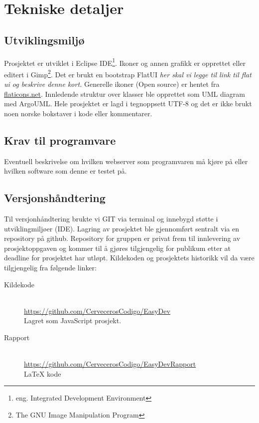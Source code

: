 \section{Tekniske detaljer}

\subsection{Utviklingsmiljø} \label{subssec:utvmiljo}
Prosjektet er utviklet i Eclipse IDE\footnote{eng. Integrated Development
Environment}. Ikoner og annen grafikk er opprettet eller editert i Gimp\footnote{The GNU Image Manipulation Program}.
Det er brukt en bootstrap FlatUI \emph{her skal vi legge til link til flat ui
og beskrive denne kort.} Generelle ikoner (Open source) er hentet fra
\href{http://www.flaticons.net}{flaticons.net}. Innledende struktur over klasser ble opprettet som UML diagram med ArgoUML.
Hele prosjektet er lagd i tegnoppsett UTF-8 og det er ikke brukt noen norske bokstaver i kode eller kommentarer.

\subsection{Krav til programvare}
Eventuell beskrivelse om hvilken webserver som programvaren må kjøre på eller
hvilken software som denne er testet på.

\subsection{Versjonshåndtering}
Til versjonhåndtering brukte vi GIT via terminal og innebygd støtte i utviklingmiljøer (IDE). Lagring av prosjektet ble gjennomført sentralt via en repository på github. Repository for gruppen er privat frem til innlevering av prosjektoppgaven og kommer til å gjøres tilgjengelig for publikum etter at deadline for prosjektet har utløpt. Kildekoden og prosjektets historikk vil da være tilgjengelig fra følgende linker:

\begin{description}
\item[Kildekode]
\hfill \\
\url{https://github.com/CervecerosCodigo/EasyDev}
\\Lagret som JavaScript prosjekt.

\item[Rapport]
\hfill \\
\url{https://github.com/CervecerosCodigo/EasyDevRapport}
\\ \LaTeX{} kode
\end{description}